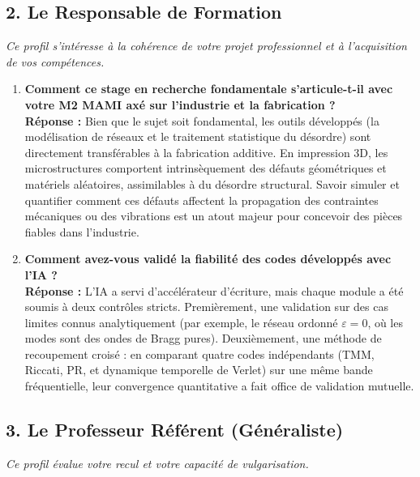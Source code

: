 \documentclass[11pt,a4paper]{article}
\begin{document}
\begin{tcolorbox}[colback=blue!5,colframe=blue!75!black,title=Slide 2 : Table des Matières --- 0:45 à 1:15]
\subsection{2. Le Responsable de Formation}
\textit{Ce profil s'intéresse à la cohérence de votre projet professionnel et à l'acquisition de vos compétences.}

\begin{enumerate}[label=\textbf{Q\arabic* :}]
    \item \textbf{Comment ce stage en recherche fondamentale s'articule-t-il avec votre M2 MAMI axé sur l'industrie et la fabrication ?} \\
    \textbf{Réponse :} \og  Bien que le sujet soit fondamental, les outils développés (la modélisation de réseaux et le traitement statistique du désordre) sont directement transférables à la fabrication additive. En impression 3D, les microstructures comportent intrinsèquement des défauts géométriques et matériels aléatoires, assimilables à du désordre structural. Savoir simuler et quantifier comment ces défauts affectent la propagation des contraintes mécaniques ou des vibrations est un atout majeur pour concevoir des pièces fiables dans l'industrie. \fg{}
    
    \item \textbf{Comment avez-vous validé la fiabilité des codes développés avec l'IA ?} \\
    \textbf{Réponse :} \og  L'IA a servi d'accélérateur d'écriture, mais chaque module a été soumis à deux contrôles stricts. Premièrement, une validation sur des cas limites connus analytiquement (par exemple, le réseau ordonné $\varepsilon = 0$, où les modes sont des ondes de Bragg pures). Deuxièmement, une méthode de recoupement croisé : en comparant quatre codes indépendants (TMM, Riccati, PR, et dynamique temporelle de Verlet) sur une même bande fréquentielle, leur convergence quantitative a fait office de validation mutuelle. \fg{}
\end{enumerate}

\subsection{3. Le Professeur Référent (Généraliste)}
\textit{Ce profil évalue votre recul et votre capacité de vulgarisation.}


\end{tcolorbox}
\end{document}
